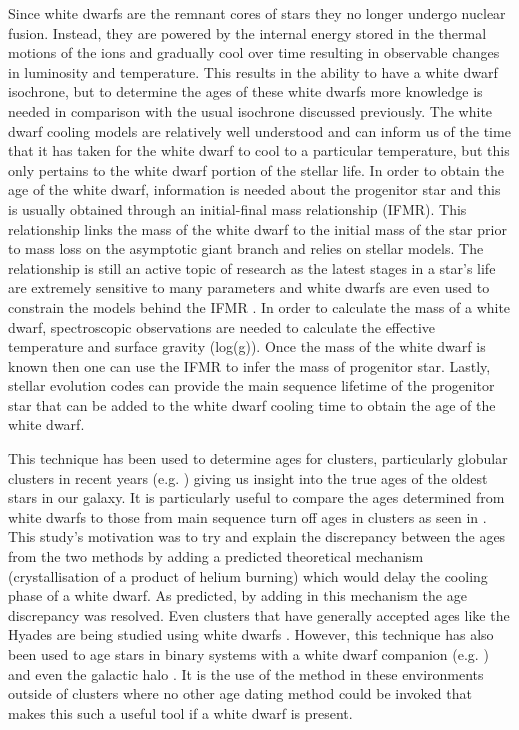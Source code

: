 Since white dwarfs are the remnant cores of stars they no longer undergo nuclear fusion. Instead, they are powered by the internal energy stored in the thermal motions of the ions and gradually cool over time \citep{Mestel_1952} resulting in observable changes in luminosity and temperature. This results in the ability to have a white dwarf isochrone, but to determine the ages of these white dwarfs more knowledge is needed in comparison with the usual isochrone discussed previously. The white dwarf cooling models are relatively well understood and can inform us of the time that it has taken for the white dwarf to cool to a particular temperature, but this only pertains to the white dwarf portion of the stellar life. In order to obtain the age of the white dwarf, information is needed about the progenitor star and this is usually obtained through an initial-final mass relationship (IFMR). This relationship links the mass of the white dwarf to the initial mass of the star prior to mass loss on the asymptotic giant branch and relies on stellar models. The relationship is still an active topic of research as the latest stages in a star's life are extremely sensitive to many parameters and white dwarfs are even used to constrain the models behind the IFMR \citep{Cummings_etal_2018}. In order to calculate the mass of a white dwarf, spectroscopic observations are needed to calculate the effective temperature and surface gravity (log(g)). Once the mass of the white dwarf is known then one can use the IFMR to infer the mass of progenitor star. Lastly, stellar evolution codes can provide the main sequence lifetime of the progenitor star that can be added to the white dwarf cooling time to obtain the age of the white dwarf.

This technique has been used to determine ages for clusters, particularly globular clusters in recent years (e.g. \citealt{Torres_etal_2015}) giving us insight into the true ages of the oldest stars in our galaxy. It is particularly useful to compare the ages determined from white dwarfs to those from main sequence turn off ages in clusters as seen in \citet{Garcia-Berro_etal_2010}. This study's motivation was to try and explain the discrepancy between the ages from the two methods by adding a predicted theoretical mechanism (crystallisation of a product of helium burning) which would delay the cooling phase of a white dwarf. As predicted, by adding in this mechanism the age discrepancy was resolved. Even clusters that have generally accepted ages like the Hyades are being studied using white dwarfs \citep{Salaris_Bedin_2018}. However, this technique has also been used to age stars in binary systems with a white dwarf companion (e.g. \citealt{Liebert_etal_2013}) and even the galactic halo \citep{Kilic_etal_2019}. It is the use of the method in these environments outside of clusters where no other age dating method could be invoked that makes this such a useful tool if a white dwarf is present.

